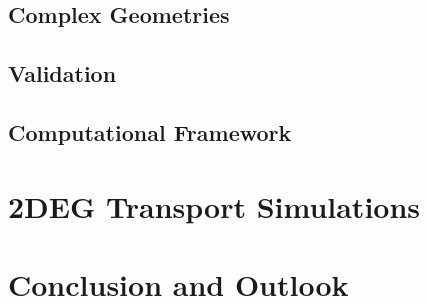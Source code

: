 \section{Complex Geometries}

\section{Validation}\label{sec:validation}

\section{Computational Framework}

\chapter{2DEG Transport Simulations}

\chapter{Conclusion and Outlook}

\appendix

\clearpage
\pagestyle{bib}





